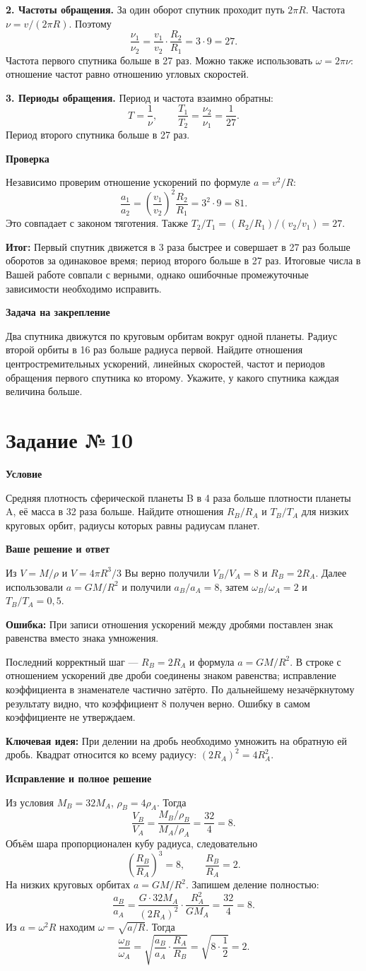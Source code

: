 \documentclass[a4paper,12pt]{article}
\newcommand{\topic}[1]{\par\medskip\textbf{\textcolor{darkaccent}{#1}}\par}
\newcommand{\error}[1]{\par\medskip\textbf{\textcolor{err}{Ошибка:}} #1\par}
\newcommand{\key}[1]{\par\medskip\textbf{\textcolor{blue!60!black}{Ключевая идея:}} #1\par}
\newcommand{\result}[1]{\par\medskip\textbf{\textcolor{accent}{Итог:}} #1\par}
\newcommand{\task}[1]{\clearpage\phantomsection\label{task:#1}\section*{Задание №\,#1}}
\begin{document}
\textbf{2. Частоты обращения.} За один оборот спутник проходит путь $2\pi R$. Частота $\nu=v/(2\pi R)$. Поэтому
\[ \frac{\nu_1}{\nu_2}=\frac{v_1}{v_2}\cdot\frac{R_2}{R_1}=3\cdot9=27. \]
Частота первого спутника больше в 27 раз. Можно также использовать $\omega=2\pi\nu$: отношение частот равно отношению угловых скоростей.

\textbf{3. Периоды обращения.} Период и частота взаимно обратны:
\[ T=\frac1\nu,\qquad \frac{T_1}{T_2}=\frac{\nu_2}{\nu_1}=\frac1{27}. \]
Период второго спутника больше в 27 раз.
\topic{Проверка}
Независимо проверим отношение ускорений по формуле $a=v^2/R$:
\[ \frac{a_1}{a_2}=\left(\frac{v_1}{v_2}\right)^2\frac{R_2}{R_1}=3^2\cdot9=81. \]
Это совпадает с законом тяготения. Также $T_2/T_1=(R_2/R_1)/(v_2/v_1)=27$.
\result{Первый спутник движется в 3 раза быстрее и совершает в 27 раз больше оборотов за одинаковое время; период второго больше в 27 раз. Итоговые числа в Вашей работе совпали с верными, однако ошибочные промежуточные зависимости необходимо исправить.}
\topic{Задача на закрепление}
Два спутника движутся по круговым орбитам вокруг одной планеты. Радиус второй орбиты в 16 раз больше радиуса первой. Найдите отношения центростремительных ускорений, линейных скоростей, частот и периодов обращения первого спутника ко второму. Укажите, у какого спутника каждая величина больше.
\task{10}
\topic{Условие}
Средняя плотность сферической планеты B в 4 раза больше плотности планеты A, её масса в 32 раза больше. Найдите отношения $R_B/R_A$ и $T_B/T_A$ для низких круговых орбит, радиусы которых равны радиусам планет.
\topic{Ваше решение и ответ}
Из $V=M/\rho$ и $V=4\pi R^3/3$ Вы верно получили $V_B/V_A=8$ и $R_B=2R_A$. Далее использовали $a=GM/R^2$ и получили $a_B/a_A=8$, затем $\omega_B/\omega_A=2$ и $T_B/T_A=0{,}5$.
\error{При записи отношения ускорений между дробями поставлен знак равенства вместо знака умножения.}
Последний корректный шаг --- $R_B=2R_A$ и формула $a=GM/R^2$. В строке с отношением ускорений две дроби соединены знаком равенства; исправление коэффициента в знаменателе частично затёрто. По дальнейшему незачёркнутому результату видно, что коэффициент 8 получен верно. Ошибку в самом коэффициенте не утверждаем.
\key{При делении на дробь необходимо умножить на обратную ей дробь. Квадрат относится ко всему радиусу: $(2R_A)^2=4R_A^2$.}
\topic{Исправление и полное решение}
Из условия $M_B=32M_A$, $\rho_B=4\rho_A$. Тогда
\[ \frac{V_B}{V_A}=\frac{M_B/\rho_B}{M_A/\rho_A}=\frac{32}{4}=8. \]
Объём шара пропорционален кубу радиуса, следовательно
\[ \left(\frac{R_B}{R_A}\right)^3=8,\qquad \frac{R_B}{R_A}=2. \]
На низких круговых орбитах $a=GM/R^2$. Запишем деление полностью:
\[ \frac{a_B}{a_A}=\frac{G\cdot32M_A}{(2R_A)^2}\cdot\frac{R_A^2}{GM_A}=\frac{32}{4}=8. \]
Из $a=\omega^2 R$ находим $\omega=\sqrt{a/R}$. Тогда
\[ \frac{\omega_B}{\omega_A}=\sqrt{\frac{a_B}{a_A}\cdot\frac{R_A}{R_B}}=\sqrt{8\cdot\frac12}=2. \]
\clearpage
\end{document}
